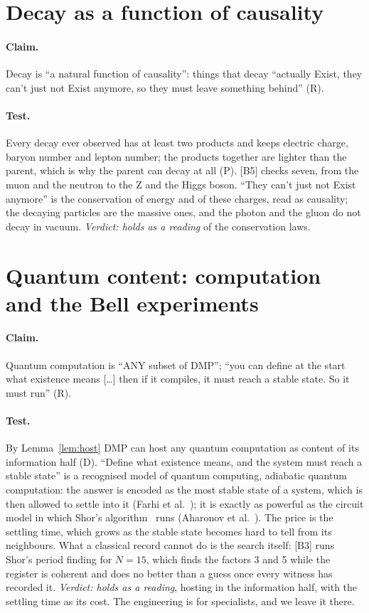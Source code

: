 \documentclass[11pt,a4paper]{article}
\theoremstyle{definition}
\newcommand{\chk}[1]{\textsf{[#1]}}
\newcommand{\tagD}{\textsf{(D)}}
\newcommand{\tagR}{\textsf{(R)}}
\newcommand{\tagP}{\textsf{(P)}}
\begin{document}
\section{Decay as a function of causality}\label{sec:decay}

\paragraph{Claim.} Decay is ``a natural function of causality'': things that decay ``actually Exist, they can't just not Exist anymore, so
they must leave something behind'' \tagR.

\paragraph{Test.} Every decay ever observed has at least two products and keeps electric charge, baryon number and lepton number; the
products together are lighter than the parent, which is why the parent can decay at all \tagP. \chk{B5} checks seven, from the muon and the
neutron to the Z and the Higgs boson. ``They can't just not Exist anymore'' is the conservation of energy and of these charges, read as
causality; the decaying particles are the massive ones, and the photon and the gluon do not decay in vacuum. \emph{Verdict: holds as a
reading} of the conservation laws.

\section{Quantum content: computation and the Bell experiments}\label{sec:qc}

\paragraph{Claim.} Quantum computation is ``ANY subset of DMP''; ``you can define at the start what existence means [\dots] then if it
compiles, it must reach a stable state. So it must run'' \tagR.

\paragraph{Test.} By Lemma~\ref{lem:host} DMP can host any quantum computation as content of its information half \tagD. ``Define what
existence means, and the system must reach a stable state'' is a recognised model of quantum computing, adiabatic quantum computation: the
answer is encoded as the most stable state of a system, which is then allowed to settle into it (Farhi et al.~\cite{farhi}); it is exactly
as powerful as the circuit model in which Shor's algorithm~\cite{shor} runs (Aharonov et al.~\cite{aharonov}). The price is the settling
time, which grows as the stable state becomes hard to tell from its neighbours. What a classical record cannot do is the search itself:
\chk{B3} runs Shor's period finding for $N=15$, which finds the factors 3 and 5 while the register is coherent and does no better than a
guess once every witness has recorded it. \emph{Verdict: holds as a reading}, hosting in the information half, with the settling time as
its cost. The engineering is for specialists, and we leave it there.
\end{document}
